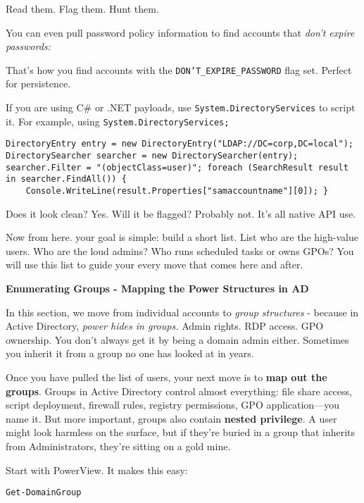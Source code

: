 Read them. Flag them. Hunt them.

You can even pull password policy information to find accounts that \textit{don’t expire passwords:}


That’s how you find accounts with the \texttt{DON'T\_EXPIRE\_PASSWORD} flag set. Perfect for persistence.

If you are using C\# or .NET payloads, use \texttt{System.DirectoryServices} to script it. For example, using \texttt{System.DirectoryServices;}

\texttt{DirectoryEntry entry = new DirectoryEntry("LDAP://DC=corp,DC=local");
DirectorySearcher searcher = new DirectorySearcher(entry);
searcher.Filter = "(objectClass=user)";
foreach (SearchResult result in searcher.FindAll()) \{
    Console.WriteLine(result.Properties["samaccountname"][0]);
\}}

Does it look clean? Yes. Will it be flagged? Probably not. It’s all native API use.

Now from here. your goal is simple: build a short list. List who are the high-value users. Who are the loud admins? Who runs scheduled tasks or owns GPOs? You will use this list to guide your every move that comes here and after.

\textbf{Enumerating Groups - Mapping the Power Structures in AD}

In this section, we move from individual accounts to \textit{group structures} - because in Active Directory, \textit{power hides in groups. }Admin rights. RDP access. GPO ownership. You don’t always get it by being a domain admin either. Sometimes you inherit it from a group no one has looked at in years.

Once you have pulled the list of users, your next move is to \textbf{map out the groups}. Groups in Active Directory control almost everything: file share access, script deployment, firewall rules, registry permissions, GPO application—you name it. But more important, groups also contain \textbf{nested privilege}. A user might look harmless on the surface, but if they’re buried in a group that inherits from Administrators, they’re sitting on a gold mine.

Start with PowerView. It makes this easy:

\texttt{Get-DomainGroup}

